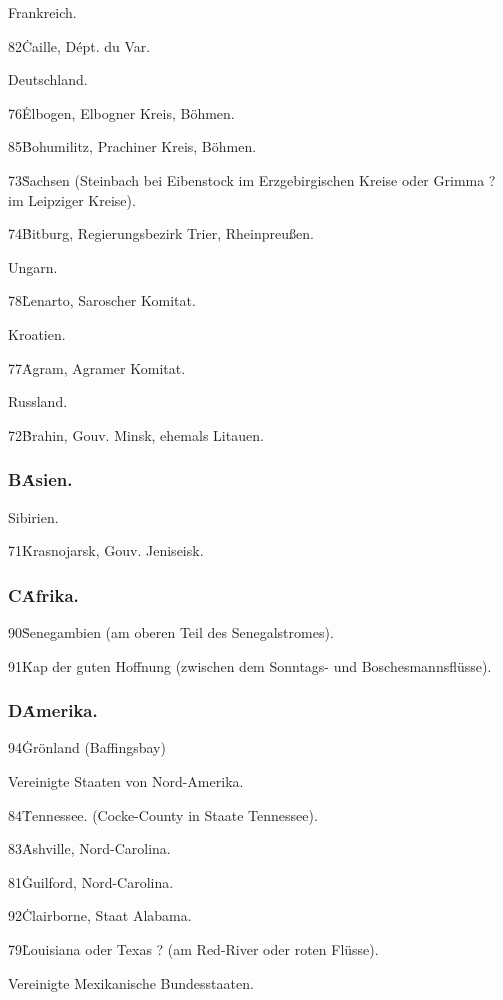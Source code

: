 \documentclass[a4paper, 11pt, oneside, polutonikogreek, german]{article}
\begin{document}
Frankreich.

82\. Caille, Dépt. du Var.

Deutschland.

76\. Elbogen, Elbogner Kreis, Böhmen.

85\. Bohumilitz, Prachiner Kreis, Böhmen.

73\. Sachsen (Steinbach bei Eibenstock im Erzgebirgischen Kreise oder Grimma ? im Leipziger Kreise).

74\. Bitburg, Regierungsbezirk Trier, Rheinpreußen.

Ungarn.

78\. Lenarto, Saroscher Komitat.

Kroatien.

77\. Agram, Agramer Komitat.

Russland.

72\. Brahin, Gouv. Minsk, ehemals Litauen.

\subsubsection{B\. Asien.}

Sibirien.

71\. Krasnojarsk, Gouv. Jeniseisk.

\subsubsection{C\. Afrika.}

90\. Senegambien (am oberen Teil des Senegalstromes).

91\. Kap der guten Hoffnung (zwischen dem Sonntags- und Boschesmannsflüsse).

\subsubsection{D\. Amerika.}

94\. Grönland (Baffingsbay)

Vereinigte Staaten von Nord-Amerika.

84\. Tennessee. (Cocke-County in Staate Tennessee).

83\. Ashville, Nord-Carolina.

81\. Guilford, Nord-Carolina.

92\. Clairborne, Staat Alabama.

79\. Louisiana oder Texas ? (am Red-River oder roten Flüsse).

Vereinigte Mexikanische Bundesstaaten.
\end{document}
